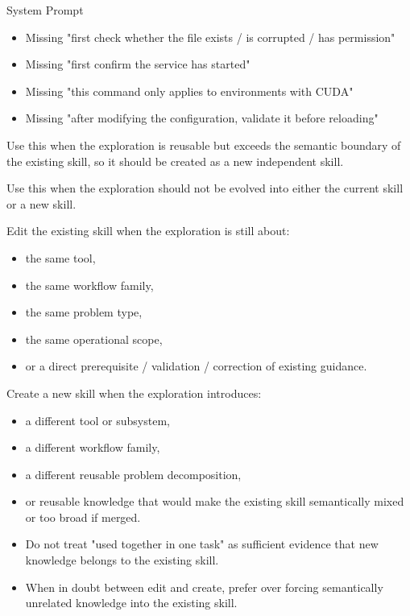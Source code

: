 \begin{svpromptbox}{System Prompt}
\begin{itemize}
\item Missing "first check whether the file exists / is corrupted / has permission"
\item Missing "first confirm the service has started"
\item Missing "this command only applies to environments with CUDA"
\item Missing "after modifying the configuration, validate it before reloading"
\end{itemize}
\smallskip
{}
\smallskip
Use this when the exploration is reusable but exceeds the semantic boundary of the existing skill, so it should be created as a new independent skill.\par
\smallskip
{}
\smallskip
Use this when the exploration should not be evolved into either the current skill or a new skill.\par
\smallskip
{}
\smallskip
{}
\smallskip
Edit the existing skill when the exploration is still about:\par
\smallskip
\begin{itemize}
\item the same tool,
\item the same workflow family,
\item the same problem type,
\item the same operational scope,
\item or a direct prerequisite / validation / correction of existing guidance.
\end{itemize}
\smallskip
Create a new skill when the exploration introduces:\par
\smallskip
\begin{itemize}
\item a different tool or subsystem,
\item a different workflow family,
\item a different reusable problem decomposition,
\item or reusable knowledge that would make the existing skill semantically mixed or too broad if merged.
\end{itemize}
\smallskip
\begin{itemize}
\item Do not treat "used together in one task" as sufficient evidence that new knowledge belongs to the existing skill.
\item When in doubt between edit and create, prefer  over forcing semantically unrelated knowledge into the existing skill.

\end{itemize}
\end{svpromptbox}
